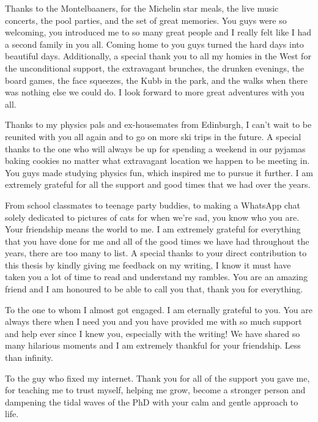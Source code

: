 Thanks to the Montelbaaners, for the Michelin star meals, the live music concerts, the pool parties, and the set of great memories. You guys were so welcoming, you introduced me to so many great people and I really felt like I had a second family in you all. Coming home to you guys turned the hard days into beautiful days. Additionally, a special thank you to all my homies in the West for the unconditional support, the extravagant brunches, the drunken evenings, the board games, the face squeezes, the Kubb in the park, and the walks when there was nothing else we could do. I look forward to more great adventures with you all.

Thanks to my physics pals and ex-housemates from Edinburgh, I can't wait to be reunited with you all again and to go on more ski trips in the future. A special thanks to the one who will always be up for spending a weekend in our pyjamas baking cookies no matter what extravagant location we happen to be meeting in. You guys made studying physics fun, which inspired me to pursue it further. I am extremely grateful for all the support and good times that we had over the years.

From school classmates to teenage party buddies, to making a WhatsApp chat solely dedicated to pictures of cats for when we're sad, you know who you are. Your friendship means the world to me. I am extremely grateful for everything that you have done for me and all of the good times we have had throughout the years, there are too many to list. A special thanks to your direct contribution to this thesis by kindly giving me feedback on my writing, I know it must have taken you a lot of time to read and understand my rambles. You are an amazing friend and I am honoured to be able to call you that, thank you for everything.

To the one to whom I almost got engaged. I am eternally grateful to you. You are always there when I need you and you have provided me with so much support and help ever since I knew you, especially with the writing! We have shared so many hilarious moments and I am extremely thankful for your friendship. Less than infinity.

To the guy who fixed my internet. Thank you for all of the support you gave me, for teaching me to trust myself, helping me grow, become a stronger person and dampening the tidal waves of the PhD with your calm and gentle approach to life.

